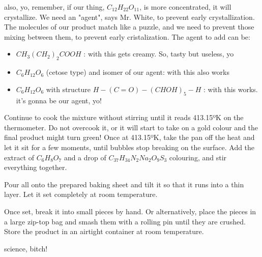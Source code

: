\documentclass[a4paper,10pt]{article}
\begin{document}
also, yo, remember, if our thing, $C_{12}H_{22}O_{11}$, is more concentrated, it will crystallize. We need
an "agent", says Mr. White, to prevent early crystallization. The molecules of our product match 
like a puzzle, and we need to prevent those mixing between them, to prevent early
cristalization. The agent to add can be:   
\begin{itemize}
 \item $CH_{3}(CH_{2})_{2}COOH$ : with this gets creamy. So, tasty but useless, yo
 \item  $C_{6}H_{12}O_{6}$ (cetose type) and isomer of our agent: with this also works
 \item  $C_{6}H_{12}O_{6}$ with structure $H-(C=O)-(CHOH)_{5}-H$ : with this works. it's gonna be our agent, yo!\\
\end{itemize}
      
\normalfont


Continue to cook the mixture without stirring until it reads 413.15ºK on the
thermometer. Do not overcook it, or it will start to take on a gold colour and
the final product might turn green! Once at 413.15ºK, take the pan off the heat
and let it sit for a few moments, until bubbles stop breaking on the surface.
Add the extract of $C_{6}H_{8}O_{7}$ and a drop of $C_{37}H_{34}N_{2}Na_{2}O_{9}S_{3}$ colouring, and stir
everything together.

Pour all onto the prepared baking sheet and tilt it so that it runs into a thin
layer. Let it set completely at room temperature.

Once set, break it into small pieces by hand. Or alternatively, place the pieces
in a large zip-top bag and smash them with a rolling pin until they are crushed.
Store the product in an airtight container at room temperature.


\normalfont\ECFAugie
\begin{center}
 science, bitch!
\end{center}
\end{document}
